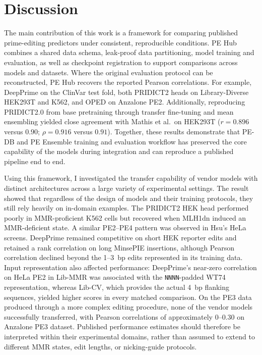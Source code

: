 \documentclass{article}
\begin{document}
\section{Discussion}

The main contribution of this work is a framework for comparing published prime-editing predictors under consistent, reproducible conditions. PE Hub combines a shared data schema, leak-proof data partitioning, model training and evaluation, as well as checkpoint registration to support comparisons across models and datasets. Where the original evaluation protocol can be reconstructed, PE Hub recovers the reported Pearson correlations. For example, DeepPrime on the ClinVar test fold, both PRIDICT2 heads on Library-Diverse HEK293T and K562, and OPED on Anzalone PE2. Additionally, reproducing PRIDICT2.0 from base pretraining through transfer fine-tuning and mean ensembling yielded close agreement with Mathis et al.\ on HEK293T ($r = 0.896$ versus $0.90$; $\rho = 0.916$ versus $0.91$). Together, these results demonstrate that PE-DB and PE Ensemble training and evaluation workflow has preserved the core capability of the models during integration and can reproduce a published pipeline end to end.

Using this framework, I investigated the transfer capability of vendor models with distinct architectures across a large variety of experimental settings. The result showed that regardless of the design of models and their training protocols, they still rely heavily on in-domain examples. The PRIDICT2 HEK head performed poorly in MMR-proficient K562 cells but recovered when MLH1dn induced an MMR-deficient state. A similar PE2–PE4 pattern was observed in Hsu’s HeLa screens. DeepPrime remained competitive on short HEK reporter edits and retained a rank correlation on long MinsePIE insertions, although Pearson correlation declined beyond the 1--3~bp edits represented in its training data. Input representation also affected performance: DeepPrime’s near-zero correlation on HeLa PE2 in Lib-MMR was associated with the \texttt{NNNN}-padded WT74 representation, whereas Lib-CV, which provides the actual 4~bp flanking sequences, yielded higher scores in every matched comparison. 
On the PE3 data produced through a more complex editing procedure, none of the vendor models successfully transferred, with Pearson correlations of approximately $0$--$0.30$ on Anzalone PE3 dataset. Published performance estimates should therefore be interpreted within their experimental domains, rather than assumed to extend to different MMR states, edit lengths, or nicking-guide protocols.
\end{document}
